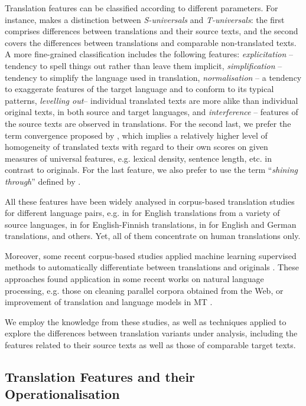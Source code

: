 \documentclass[output=paper]{LSP/langsci}
\begin{document}
Translation features can be classified according to different parameters. For instance, \citet{Chesterman2004} makes a distinction between \textit{S-universals} and \textit{T-universals}: the ﬁrst comprises differences between translations and their source texts, and the second covers the differences between translations and comparable non-translated texts. A more ﬁne-grained classification includes the following features: \textit{explicitation} – tendency to spell things out rather than leave them implicit, \textit{simplification} – tendency to simplify the language used in translation, \textit{normalisation} – a tendency to exaggerate features of the target language and to conform to its typical patterns, \textit{levelling out}– individual translated texts are more alike than individual original texts, in both source and target languages, and \textit{interference} – features of the source texts are observed in translations. For the second last, we prefer the term convergence proposed by \citet{Laviosa2002}, which implies a relatively higher level of homogeneity of translated texts with regard to their own scores on given measures of universal features, e.g. lexical density, sentence length, etc. in contrast to originals.  For the last feature, we also prefer to use the term “\textit{shining through}” defined by \citet{Teich2003}.

All these features have been widely analysed in corpus-based translation studies for different language pairs, e.g. in \citet{Laviosa1996} for English translations from a variety of source languages, in \citet{Mauranen2000} for English-Finnish translations, in \citet{Teich2003} for English and German translations, and others. Yet, all of them concentrate on human translations only.

Moreover, some recent corpus-based studies applied machine learning supervised methods to automatically differentiate between translations and originals \citep[e.g.][]{Baroni2006}. These approaches found application in some recent works on natural language processing, e.g. those on cleaning parallel corpora obtained from the Web, or improvement of translation and language models in MT  \citep[e.g.][]{Kurokawa2009,KoppelOrdan2011,Lembersky2012}.

We employ the knowledge from these studies, as well as techniques applied to explore the differences between translation variants under analysis, including the features related to their source texts as well as those of comparable target texts.

\subsection{Translation Features and their Operationalisation}
\end{document}
